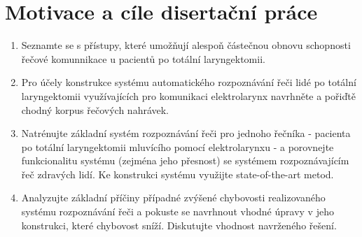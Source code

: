 \chapter{Motivace a cíle disertační práce}

\begin{enumerate}
  \item Seznamte se s přístupy, které umožňují alespoň částečnou obnovu schopnosti řečové komunnikace u pacientů po totální laryngektomii.
  \item Pro účely konstrukce systému automatického rozpoznávání řeči lidé po totální laryngektomii využívajících pro komunikaci elektrolarynx navrhněte a pořiďtě chodný korpus řečových nahrávek.
  \item Natrénujte základní systém rozpoznávání řeči pro jednoho řečníka - pacienta po totální laryngektomii mluvícího pomocí elektrolarynxu - a porovnejte funkcionalitu systému (zejména jeho přesnost) se systémem rozpoznávajícím řeč zdravých lidí. Ke konstrukci systému využijte state-of-the-art metod.
  \item Analyzujte základní příčiny případné zvýšené chybovosti realizovaného systému rozpoznávání řeči a pokuste se navrhnout vhodné úpravy v jeho konstrukci, které chybovost sníží. Diskutujte vhodnost navrženého řešení.
\end{enumerate}
